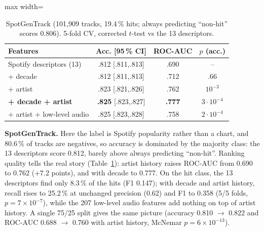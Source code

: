 \begin{table}[!htbp]
\centering
\caption{SpotGenTrack (101{,}909 tracks, 19.4\,\% hits; always predicting ``non-hit''
scores 0.806). 5-fold CV, corrected $t$-test vs the 13 descriptors.}
\label{tab:sgt}
\footnotesize
\setlength{\tabcolsep}{3pt}
\begin{adjustbox}{max width=\columnwidth}
\begin{tabular}{@{}lccc@{}}
\toprule
Features & Acc. [95\,\% CI] & ROC-AUC & $p$ (acc.) \\
\midrule
Spotify descriptors (13) & .812 [.811,.813] & .690 & -- \\
+ decade & .812 [.811,.813] & .712 & .66 \\
+ artist & .823 [.821,.826] & .762 & $10^{-3}$ \\
\textbf{+ decade + artist} & \textbf{.825} [.823,.827] & \textbf{.777} & $3{\cdot}10^{-4}$ \\
+ artist + low-level audio & .825 [.823,.828] & .758 & $2{\cdot}10^{-4}$ \\
\bottomrule
\end{tabular}
\end{adjustbox}
\end{table}

\textbf{SpotGenTrack.} Here the label is Spotify popularity rather than a chart, and
80.6\,\% of tracks are negatives, so accuracy is dominated by the majority class: the 13
descriptors score 0.812, barely above always predicting ``non-hit''. Ranking quality tells
the real story (Table~\ref{tab:sgt}): artist history raises ROC-AUC from 0.690 to 0.762
($+7.2$ points), and with decade to 0.777. On the hit class, the 13 descriptors find
only 8.3\,\% of the hits (F1 0.147); with decade and artist history, recall rises to
25.2\,\% at unchanged precision (0.62) and F1 to 0.358 (5/5 folds, $p=7\times10^{-7}$),
while the 207 low-level audio features add
nothing on top of artist history. A single 75/25 split gives the same picture (accuracy
0.810 $\to$ 0.822 and ROC-AUC 0.688 $\to$ 0.760 with artist history, McNemar
$p=6\times10^{-13}$).


\FloatBarrier
